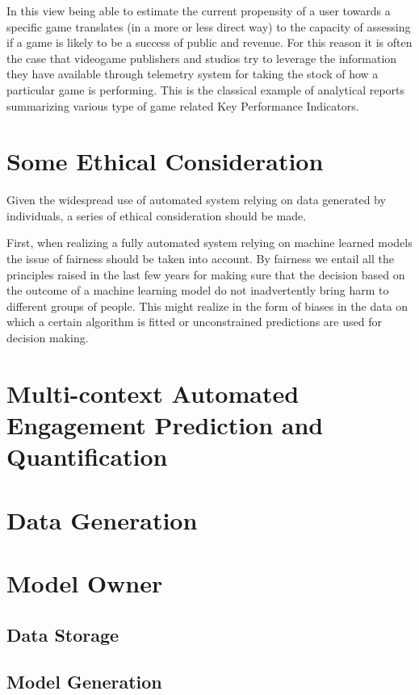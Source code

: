 In this view being able to estimate the current propensity of a user towards a specific game translates (in a more or less direct way) to the capacity of assessing if a game is likely to be a success of public and revenue. For this reason it is often the case that videogame publishers and studios try to leverage the information they have available through telemetry system for taking the stock of how a particular game is performing. This is the classical example of analytical reports summarizing various type of game related Key Performance Indicators. 

\section{Some Ethical Consideration}
\label{industry_needs}
Given the widespread use of automated system relying on data generated by individuals, a series of ethical consideration should be made.

First, when realizing a fully automated system relying on machine learned models the issue of fairness should be taken into account. By fairness we entail all the principles raised in the last few years for making sure that the decision based on the outcome of a machine learning model do not inadvertently bring harm to different groups of people. This might realize in the form of biases in the data on which a certain algorithm is fitted or unconstrained predictions are used for decision making.

\section{Multi-context Automated Engagement Prediction and Quantification}
\label{industry_needs}

\section{Data Generation}
\lorem
\section{Model Owner}
\lorem
\subsection{Data Storage}
\lorem
\subsection{Model Generation}
\lorem
